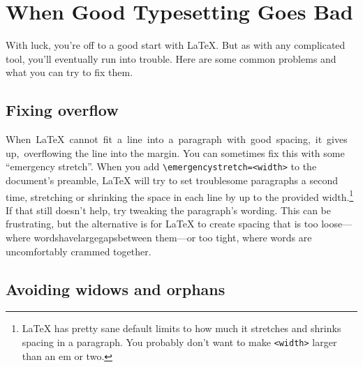 \chapter{When Good Typesetting Goes Bad}

With luck, you're off to a good start with \LaTeX.
But as with any complicated tool, you'll eventually run into trouble.
Here are some common problems and what you can try to fix them.

\section{Fixing overflow}

\mbox{When \LaTeX{} cannot fit a line into a paragraph with good spacing,
it gives up, overflowing} the line into the margin.
You can sometimes fix this with some ``emergency stretch''\quotekern.
When you add \texttt{\textbackslash emergencystretch=\allowbreak<width>}
to the document's preamble,
\LaTeX{} will try to set troublesome paragraphs a second time,
stretching or shrinking the space in each line by up to the provided
width.\punckern\footnote{\LaTeX{} has pretty sane default limits to how much
it stretches and shrinks spacing in a paragraph.
You probably don't want to make \texttt{<width>} larger than an em or two.}
If that still doesn't help, try tweaking the paragraph's wording.
This can be frustrating, but the alternative is for \LaTeX{} to create spacing
that is too loose---where\quad
words\quad have\quad large\quad gaps\quad between\quad
them---or too tight, where\! words\! are\! uncomfortably\! crammed\! together.

\section{Avoiding widows and orphans}

